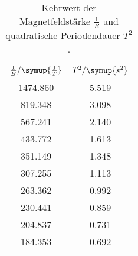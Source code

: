 \begin{table}[!htp]
\centering
\caption{Kehrwert der Magnetfeldstärke $\frac{1}{B}$ und quadratische Periodendauer $T^2$.}
\label{tab:schwing2}
\begin{tabular}{c c}
\toprule
{$\frac{1}{B} / \symup{\frac{1}{T}}$} & {$T^2 / \symup{s^2}$} \\
\midrule
1474.860 & 5.519 \\
819.348 & 3.098 \\
567.241 & 2.140 \\
433.772 & 1.613 \\
351.149 & 1.348 \\
307.255 & 1.113 \\
263.362 & 0.992 \\
230.441 & 0.859 \\
204.837 & 0.731 \\
184.353 & 0.692 \\
\bottomrule
\end{tabular}
\end{table}